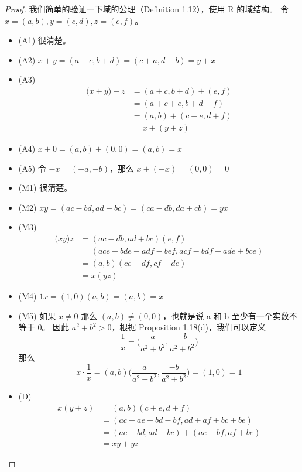 \documentclass[../poma-note.tex]{subfiles}
\begin{document}
\begin{proof}
	我们简单的验证一下域的公理（Definition 1.12），使用 R 的域结构。
	令 $x=(a,b), y=(c,d), z=(e,f)$。
	\begin{itemize}
		\item[] (A1) 很清楚。
		\item[] (A2) $x+y = (a+c,b+d) = (c+a,d+b) = y+x$
		\item[] (A3)
			\vspace{-26pt}
			\begin{align*}
				\mathcal (x+y)+z & = (a+c,b+d) + (e,f) \\
				                 & = (a+c+e, b+d+f)    \\
				                 & = (a,b) + (c+e,d+f) \\
				                 & = x+(y+z)
			\end{align*}
		\item[] (A4) $x+0 = (a,b) + (0,0) = (a,b) = x$
		\item[] (A5) 令 $-x = (-a,-b)$，那么 $x+(-x) = (0,0) = 0$
		\item[] (M1) 很清楚。
		\item[] (M2) $xy = (ac-bd,ad+bc) = (ca-db,da+cb) = yx$
		\item[] (M3)
			\vspace{-26pt}
			\begin{align*}
				\mathcal (xy)z & = (ac-db,ad+bc)(e,f)                \\
				               & = (ace-bde-adf-bef,acf-bdf+ade+bce) \\
				               & = (a,b)(ce-df,cf+de)                \\
				               & = x(yz)
			\end{align*}
		\item[] (M4) $1x  =(1,0)(a,b) = (a,b) = x$
		\item[] (M5) 如果 $x \ne 0$ 那么 $(a,b) \ne (0,0)$，也就是说 a 和 b 至少有一个实数不等于 0。
			因此 $a^2+b^2>0$，根据 Proposition 1.18(d)，我们可以定义
			\[\frac{1}{x} = \bigl(\frac{a}{a^2+b^2}, \frac{-b}{a^2+b^2}\bigr)\]
			那么
			\[x \cdot \frac{1}{x} = (a,b)\bigl(\frac{a}{a^2+b^2}, \frac{-b}{a^2+b^2}\bigr) = (1,0) = 1\]
		\item[] (D)
			\vspace{-26pt}
			\begin{align*}
				\mathcal{} x(y+z) & = (a,b)(c+e,d+f)                \\
				                  & = (ac+ae-bd-bf,ad+af+bc+be)     \\
				                  & = (ac-bd,ad+bc) + (ae-bf,af+be) \\
				                  & = xy + yz
			\end{align*}
	\end{itemize}
\end{proof}
\end{document}
